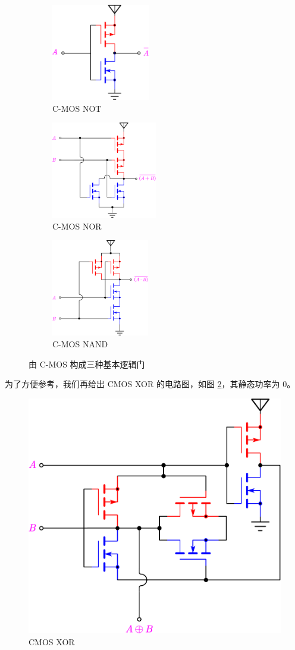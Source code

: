 \documentclass[UTF8]{report}
\theoremstyle{MyLineTheoremStyle} %
\theoremstyle{MyBlockTheoremStyle} %
\theoremstyle{MySubsubsectionStyle} %
\begin{document}
\begin{figure}[H]\centering
    \begin{subfigure}[t]{0.33\columnwidth}\centering
        \includegraphics[height=120pt]{assets/2/CMOS NOT.pdf}
        \caption{ C-MOS NOT }
    \end{subfigure}\hfill
    \begin{subfigure}[t]{0.33\columnwidth}\centering
        \includegraphics[height=120pt]{assets/2/CMOS NOR.pdf}
        \caption{ C-MOS NOR }
    \end{subfigure}
    \begin{subfigure}[t]{0.33\columnwidth}\centering
        \includegraphics[height=120pt]{assets/2/CMOS NAND.pdf}
        \caption{ C-MOS NAND }
    \end{subfigure}
    \caption{ 由 C-MOS 构成三种基本逻辑门 }\label{由 C-MOS 构成三种基本逻辑门}
\end{figure}

为了方便参考，我们再给出 CMOS XOR 的电路图，如图 \ref{CMOS XOR}，其静态功率为 0。

\begin{figure}[H]\centering
\includegraphics[width=0.42\columnwidth]{assets/2/CMOS XOR.pdf}
\caption{ CMOS XOR }\label{CMOS XOR}
\end{figure}
\end{document}
